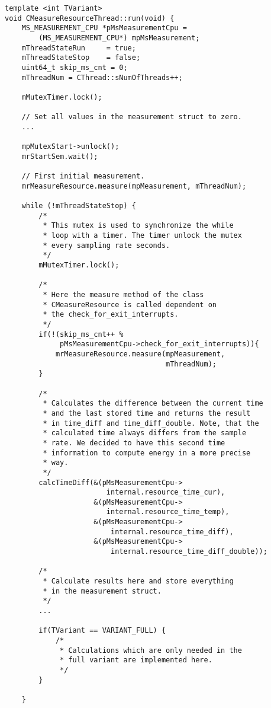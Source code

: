 \begin{description}
\pagebreak
\vspace*{-2.6cm}

\begin{lstlisting}[caption={Scheme of the \texttt{run()} method that each \texttt{CMeasureResourceThread} must have. \added[id=ck]{Listing aktualisiert}}, label=lst:RunMethodScheme]
template <int TVariant>
void CMeasureResourceThread::run(void) {
	MS_MEASUREMENT_CPU *pMsMeasurementCpu =
		(MS_MEASUREMENT_CPU*) mpMsMeasurement;
	mThreadStateRun		= true;
	mThreadStateStop	= false;
	uint64_t skip_ms_cnt = 0;
	mThreadNum = CThread::sNumOfThreads++;
	
	mMutexTimer.lock();
	
	// Set all values in the measurement struct to zero.
	...
	
	mpMutexStart->unlock();
	mrStartSem.wait();
	
	// First initial measurement. 
	mrMeasureResource.measure(mpMeasurement, mThreadNum);
	
	while (!mThreadStateStop) {
		/*
		 * This mutex is used to synchronize the while
		 * loop with a timer. The timer unlock the mutex
		 * every sampling rate seconds.
		 */
		mMutexTimer.lock();
		
		/*
		 * Here the measure method of the class
		 * CMeasureResource is called dependent on
		 * the check_for_exit_interrupts.
		 */
		if(!(skip_ms_cnt++ %
			 pMsMeasurementCpu->check_for_exit_interrupts)){
			mrMeasureResource.measure(mpMeasurement,
									  mThreadNum);
		}
		
		/*
		 * Calculates the difference between the current time
		 * and the last stored time and returns the result
		 * in time_diff and time_diff_double. Note, that the
		 * calculated time always differs from the sample
		 * rate. We decided to have this second time
		 * information to compute energy in a more precise
		 * way.
		 */
		calcTimeDiff(&(pMsMeasurementCpu->
				       	internal.resource_time_cur),
					 &(pMsMeasurementCpu->
					 	internal.resource_time_temp),
					 &(pMsMeasurementCpu->
						 internal.resource_time_diff),
					 &(pMsMeasurementCpu->
						 internal.resource_time_diff_double));
			
		/* 
		 * Calculate results here and store everything
		 * in the measurement struct.
		 */
		...
		
		if(TVariant == VARIANT_FULL) {
			/*
			 * Calculations which are only needed in the
			 * full variant are implemented here.
			 */
		}
		
	}
	

\end{lstlisting}
\end{description}
